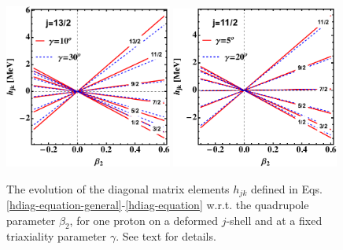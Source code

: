 \begin{figure}
    \centering
    \includegraphics[width=0.49\textwidth]{Chapters/Figures/singleParticle-hdiag-1.pdf}
    \includegraphics[width=0.49\textwidth]{Chapters/Figures/singleParticle-hdiag-2.pdf}
    \caption{The evolution of the diagonal matrix elements $h_{jk}$ defined in Eqs. \ref{hdiag-equation-general}-\ref{hdiag-equation} w.r.t. the quadrupole parameter $\beta_2$, for one proton on a deformed $j$-shell and at a fixed triaxiality parameter $\gamma$. See text for details.}
    \label{hdiag-beta-evolution}
\end{figure}
